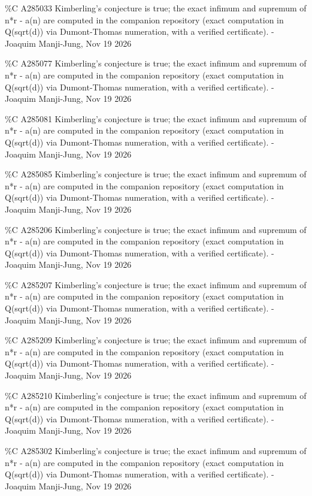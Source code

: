 {\%C A285033 Kimberling's conjecture is true; the exact infimum and supremum of n*r - a(n) are computed in the companion repository (exact computation in Q(sqrt(d)) via Dumont-Thomas numeration, with a verified certificate). - Joaquim Manji-Jung, Nov 19 2026\par
\%C A285077 Kimberling's conjecture is true; the exact infimum and supremum of n*r - a(n) are computed in the companion repository (exact computation in Q(sqrt(d)) via Dumont-Thomas numeration, with a verified certificate). - Joaquim Manji-Jung, Nov 19 2026\par
\%C A285081 Kimberling's conjecture is true; the exact infimum and supremum of n*r - a(n) are computed in the companion repository (exact computation in Q(sqrt(d)) via Dumont-Thomas numeration, with a verified certificate). - Joaquim Manji-Jung, Nov 19 2026\par
\%C A285085 Kimberling's conjecture is true; the exact infimum and supremum of n*r - a(n) are computed in the companion repository (exact computation in Q(sqrt(d)) via Dumont-Thomas numeration, with a verified certificate). - Joaquim Manji-Jung, Nov 19 2026\par
\%C A285206 Kimberling's conjecture is true; the exact infimum and supremum of n*r - a(n) are computed in the companion repository (exact computation in Q(sqrt(d)) via Dumont-Thomas numeration, with a verified certificate). - Joaquim Manji-Jung, Nov 19 2026\par
\%C A285207 Kimberling's conjecture is true; the exact infimum and supremum of n*r - a(n) are computed in the companion repository (exact computation in Q(sqrt(d)) via Dumont-Thomas numeration, with a verified certificate). - Joaquim Manji-Jung, Nov 19 2026\par
\%C A285209 Kimberling's conjecture is true; the exact infimum and supremum of n*r - a(n) are computed in the companion repository (exact computation in Q(sqrt(d)) via Dumont-Thomas numeration, with a verified certificate). - Joaquim Manji-Jung, Nov 19 2026\par
\%C A285210 Kimberling's conjecture is true; the exact infimum and supremum of n*r - a(n) are computed in the companion repository (exact computation in Q(sqrt(d)) via Dumont-Thomas numeration, with a verified certificate). - Joaquim Manji-Jung, Nov 19 2026\par
\%C A285302 Kimberling's conjecture is true; the exact infimum and supremum of n*r - a(n) are computed in the companion repository (exact computation in Q(sqrt(d)) via Dumont-Thomas numeration, with a verified certificate). - Joaquim Manji-Jung, Nov 19 2026\par
}
